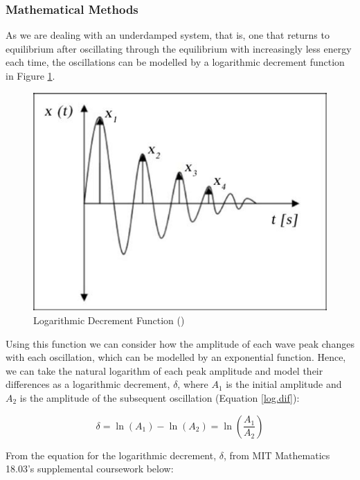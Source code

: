 \documentclass[12pt]{article}
\begin{document}
\subsubsection{Mathematical Methods}
As we are dealing with an underdamped system, that is, one that returns to equilibrium after oscillating through the equilibrium with increasingly less energy each time, the oscillations can be modelled by a logarithmic decrement function in Figure \ref{fig:log.dec}.

\begin{figure}[h]
    \centering
    \includegraphics[scale=0.5]{images/log dec.jpg}
    \caption{Logarithmic Decrement Function (\citeauthor{jovanović_simonovic_lukić_zorić_stup_ilić_2014})}
    \label{fig:log.dec}
\end{figure}

Using this function we can consider how the amplitude of each wave peak changes with each oscillation, which can be modelled by an exponential function. Hence, we can take the natural logarithm of each peak amplitude and model their differences as a logarithmic decrement, $\delta$, where $A_1$ is the initial amplitude and $A_2$ is the amplitude of the subsequent oscillation (Equation \ref{log.dif}):

\begin{equation}\label{log.dif}
    \delta = \ln(A_1) - \ln(A_2) = \ln(\frac{A_1}{A_2})
\end{equation}

From the equation for the logarithmic decrement, $\delta$, from MIT Mathematics 18.03's supplemental coursework below:

\vspace{-5mm}
\end{document}
